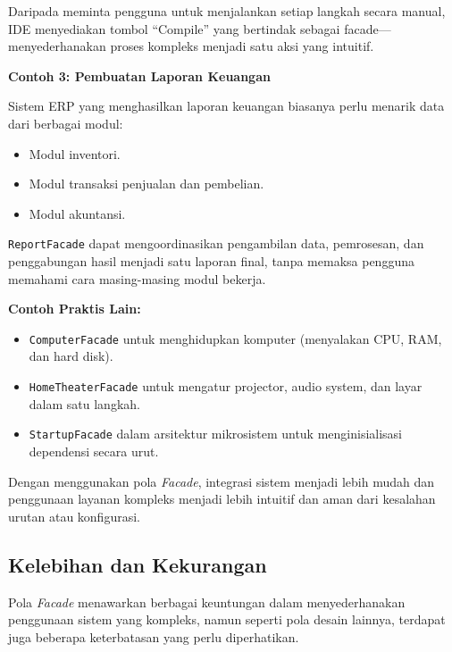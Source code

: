 Daripada meminta pengguna untuk menjalankan setiap langkah secara manual, IDE menyediakan tombol “Compile” yang bertindak sebagai facade—menyederhanakan proses kompleks menjadi satu aksi yang intuitif.

\textbf{Contoh 3: Pembuatan Laporan Keuangan}

Sistem ERP yang menghasilkan laporan keuangan biasanya perlu menarik data dari berbagai modul:
\begin{itemize}
	\item Modul inventori.
	\item Modul transaksi penjualan dan pembelian.
	\item Modul akuntansi.
\end{itemize}

\texttt{ReportFacade} dapat mengoordinasikan pengambilan data, pemrosesan, dan penggabungan hasil menjadi satu laporan final, tanpa memaksa pengguna memahami cara masing-masing modul bekerja.

\textbf{Contoh Praktis Lain:}
\begin{itemize}
	\item \texttt{ComputerFacade} untuk menghidupkan komputer (menyalakan CPU, RAM, dan hard disk).
	\item \texttt{HomeTheaterFacade} untuk mengatur projector, audio system, dan layar dalam satu langkah.
	\item \texttt{StartupFacade} dalam arsitektur mikrosistem untuk menginisialisasi dependensi secara urut.
\end{itemize}

Dengan menggunakan pola \textit{Facade}, integrasi sistem menjadi lebih mudah dan penggunaan layanan kompleks menjadi lebih intuitif dan aman dari kesalahan urutan atau konfigurasi.


\subsection{Kelebihan dan Kekurangan}

Pola \textit{Facade} menawarkan berbagai keuntungan dalam menyederhanakan penggunaan sistem yang kompleks, namun seperti pola desain lainnya, terdapat juga beberapa keterbatasan yang perlu diperhatikan.

